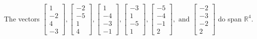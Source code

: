 \begin{exercise}
\begin{exerciseStatement}
  \end{exerciseStatement}
  \begin{exerciseAnswer}
   The vectors \(\left[\begin{array}{r}
1 \\
-2 \\
4 \\
-3
\end{array}\right] , \left[\begin{array}{r}
-2 \\
-5 \\
1 \\
4
\end{array}\right] , \left[\begin{array}{r}
1 \\
-4 \\
-3 \\
-1
\end{array}\right] , \left[\begin{array}{r}
-3 \\
1 \\
-5 \\
1
\end{array}\right] , \left[\begin{array}{r}
-5 \\
-4 \\
-1 \\
2
\end{array}\right] , \text{ and } \left[\begin{array}{r}
-2 \\
-3 \\
-2 \\
2
\end{array}\right]\) 
  	 do  
	span \(\mathbb{R}^4\).
  


  \end{exerciseAnswer}
\end{exercise}